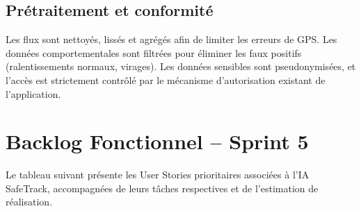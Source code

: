 \subsection{Prétraitement et conformité}
Les flux sont nettoyés, lissés et agrégés afin de limiter les erreurs de GPS. Les données comportementales sont filtrées pour éliminer les faux positifs (ralentissements normaux, virages). Les données sensibles sont pseudonymisées, et l'accès est strictement contrôlé par le mécanisme d'autorisation existant de l'application.

\section{Backlog Fonctionnel – Sprint 5}
Le tableau suivant présente les User Stories prioritaires associées à l'IA SafeTrack, accompagnées de leurs tâches respectives et de l'estimation de réalisation.

